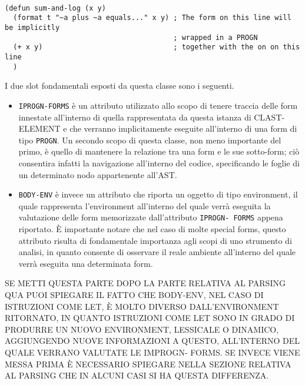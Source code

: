 \begin{lstlisting}[caption=Esempio di costrutto che fa utilizzo di del
costrutto PROGN in modo implicito]

(defun sum-and-log (x y)
  (format t "~a plus ~a equals..." x y) ; The form on this line will be implicitly
                                        ; wrapped in a PROGN
  (+ x y)                               ; together with the on on this line
  )

\end{lstlisting}

I due slot fondamentali esposti da questa classe sono i seguenti.\\

\begin{itemize}

\item \texttt{IPROGN-FORMS} è un attributo utilizzato allo scopo di tenere
traccia delle form innestate all’interno di quella rappresentata da questa
istanza di CLAST-ELEMENT e che verranno implicitamente eseguite all’interno di
una form di tipo \texttt{PROGN}. Un secondo scopo di questa classe, non meno
importante del primo, è quello di mantenere la relazione tra una form e le sue
sotto-form; ciò consentira infatti la navigazione all'interno del codice,
specificando le foglie di un determinato nodo appartenente all'AST.

\item \texttt{BODY-ENV} è invece un attributo che riporta un oggetto di tipo
environment, il quale rappresenta l’environment all’interno del quale verrà
eseguita la valutazione delle form memorizzate dall’attributo \texttt{IPROGN-
FORMS} appena riportato. È importante notare che nel caso di molte special
forms, questo attributo risulta di fondamentale importanza agli scopi di uno
strumento di analisi, in quanto consente di osservare il reale ambiente
all'interno del quale verrà eseguita una determinata form.

\end{itemize}

SE METTI QUESTA PARTE DOPO LA PARTE RELATIVA AL PARSING QUA PUOI SPIEGARE IL
FATTO CHE BODY-ENV, NEL CASO DI ISTRUZIONI COME LET, È MOLTO DIVERSO
DALL’ENVIRONMENT RITORNATO, IN QUANTO ISTRUZIONI COME LET SONO IN GRADO DI
PRODURRE UN NUOVO ENVIRONMENT, LESSICALE O DINAMICO, AGGIUNGENDO NUOVE
INFORMAZIONI A QUESTO, ALL’INTERNO DEL QUALE VERRANO VALUTATE LE IMPROGN-
FORMS. SE INVECE VIENE MESSA PRIMA È NECESSARIO SPIEGARE NELLA SEZIONE
RELATIVA AL PARSING CHE IN ALCUNI CASI SI HA QUESTA DIFFERENZA.\\

